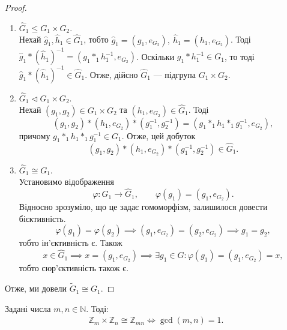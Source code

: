 \documentclass{math_library}
\begin{document}
\begin{proof}
\begin{enumerate}[wide=0pt,topsep=0pt,label={\Roman*.}]
\item $\hat{G}_1 \leq G_1 \times G_2$.\\
Нехай $\hat{g}_1, \hat{h}_1 \in \hat{G}_1$, тобто $\hat{g}_1 = (g_1, e_{G_2}),\ \hat{h}_1 = (h_1, e_{G_2})$. Тоді $\hat{g}_1 * (\hat{h}_1)^{-1} = (g_1 *_1 h_1^{-1}, e_{G_2})$. Оскільки $g_1 * h_1^{-1} \in G_1$, то тоді $\hat{g}_1 * (\hat{h}_1)^{-1} \in \hat{G}_1$. Отже, дійсно $\hat{G}_1$ --- підгрупа $G_1 \times G_2$.

\item $\hat{G}_1 \triangleleft G_1 \times G_2$.\\
Нехай $(g_1,g_2) \in G_1 \times G_2$ та $(h_1,e_{G_2}) \in \hat{G}_1$. Тоді 
\[
(g_1,g_2)*(h_1,e_{G_2})*(g_1^{-1},g_2^{-1}) = (g_1*_1 h_1 *_1 g_1^{-1}, e_{G_2}),
\] 
причому $g_1*_1 h_1 *_1 g_1^{-1} \in G_1$. Отже, цей добуток 
\[
(g_1,g_2)*(h_1,e_{G_2})*(g_1^{-1},g_2^{-1}) \in \hat{G}_1.
\]

\item $\hat{G}_1 \cong G_1$.\\
Установимо відображення 
\[ 
\varphi \colon G_1 \to \hat{G}_1, \qquad \varphi(g_1) = (g_1,e_{G_2}).
\] Відносно зрозуміло, що це задає гомоморфізм, залишилося довести бієктивність.
\[
\varphi(g_1) = \varphi(g_2) \implies (g_1,e_{G_2}) = (g_2,e_{G_2}) \implies g_1 = g_2,
\]
тобто ін'єктивність є. Також
\[
x \in \hat{G}_1 \implies x = (g_1,e_{G_2}) \implies \exists g_1 \in G: \varphi(g_1) = (g_1,e_{G_2}) = x,
\]
тобто сюр'єктивність також є.
\end{enumerate}
Отже, ми довели $\tilde{G}_1 \cong G_1$.
\end{proof}

\begin{theorem}
Задані числа $m,n \in \mathbb{N}$. Тоді:
\begin{align*}
\mathbb{Z}_m \times \mathbb{Z}_n \cong \mathbb{Z}_{mn} \iff \gcd(m,n) = 1.
\end{align*}
\end{theorem}
\end{document}
